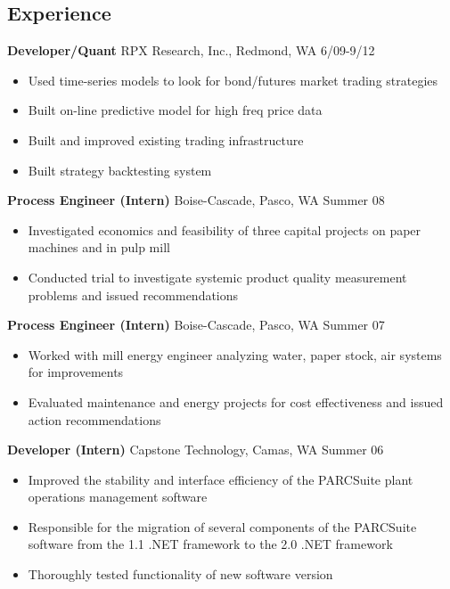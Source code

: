 \documentclass[margin]{res}
\begin{document}
 
 
\begin{resume} 
 

\section{Experience}
  {\bf Developer/Quant} RPX Research, Inc., Redmond, WA \hfill 6/09-9/12 
    \vspace{6pt}
   \begin{itemize} \itemsep -2pt  %
     \item Used time-series models to look for bond/futures market trading strategies 
     \item Built on-line predictive model for high freq price data 
     \item Built and improved existing trading infrastructure
     \item Built strategy backtesting system
   \end{itemize}

  {\bf Process Engineer (Intern)} Boise-Cascade, Pasco, WA \hfill  Summer 08
    \vspace{6pt}
  \begin{itemize} \itemsep -2pt %
    \item Investigated economics and feasibility of three capital projects on paper machines and in pulp mill 
    \item Conducted trial to investigate systemic product quality measurement problems and issued recommendations 
  \end{itemize}

  {\bf Process Engineer (Intern)} Boise-Cascade, Pasco, WA \hfill  Summer 07
    \vspace{6pt}
  \begin{itemize} \itemsep -2pt
    \item Worked with mill energy engineer analyzing water, paper stock, air systems for improvements 
    \item Evaluated maintenance and energy projects for cost effectiveness and issued action recommendations 
   \end{itemize}

  {\bf Developer (Intern)} Capstone Technology, Camas, WA \hfill  Summer 06
    \vspace{6pt}
  \begin{itemize} \itemsep -2pt
    \item Improved the stability and interface efficiency of the PARCSuite plant operations management software 
    \item Responsible for the migration of several components of the PARCSuite software from the 1.1 .NET framework to the 2.0 .NET framework 
    \item Thoroughly tested functionality of new software version 
   \end{itemize}


\end{resume}
\end{document}
